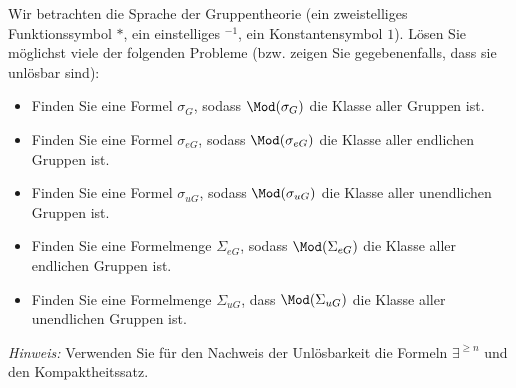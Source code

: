 
\begin{exercise}[128]

Wir betrachten die Sprache der Gruppentheorie (ein zweistelliges Funktionssymbol $*$,
ein einstelliges $^{-1}$, ein Konstantensymbol $1$). Lösen Sie möglichst viele
der folgenden Probleme (bzw. zeigen Sie gegebenenfalls, dass sie unlösbar sind):
\begin{itemize}
  \item Finden Sie eine Formel $\sigma_G$, sodass $\Mod(\sigma_G)$ die Klasse
  aller Gruppen ist.
  \item Finden Sie eine Formel $\sigma_{eG}$, sodass $\Mod(\sigma_{eG})$ die
  Klasse aller endlichen Gruppen ist.
  \item Finden Sie eine Formel $\sigma_{uG}$, sodass $\Mod(\sigma_{uG})$ die Klasse
  aller unendlichen Gruppen ist.
  \item Finden Sie eine Formelmenge $\Sigma_{eG}$, sodass $\Mod(\Sigma_{eG})$ die
  Klasse aller endlichen Gruppen ist.
  \item Finden Sie eine Formelmenge $\Sigma_{uG}$, dass $\Mod(\Sigma_{uG})$ die
  Klasse aller unendlichen Gruppen ist.
\end{itemize}
\textit{Hinweis:} Verwenden Sie für den Nachweis der Unlösbarkeit die Formeln
$\exists^{\geq n}$ und den Kompaktheitssatz.
\end{exercise}


